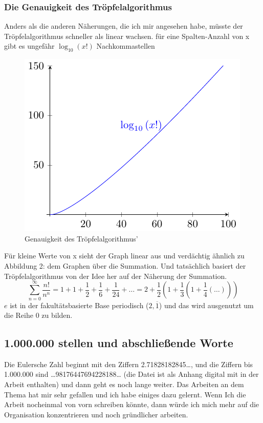\subsubsection{Die Genauigkeit des Tröpfelalgorithmus}
Anders als die anderen Näherungen, die ich mir angesehen habe, müsste der Tröpfelalgorithmus schneller als linear wachsen. für eine Spalten-Anzahl von x gibt es ungefähr $\log_{10}{(x!)}$ Nachkommastellen
\begin{figure}[h]
\includegraphics{medien2/log10/log.pdf}
\centering
\caption{Genauigkeit des Tröpfelalgorithmus'}
\end{figure}
\par Für kleine Werte von x sieht der Graph linear aus und verdächtig ähnlich zu Abbildung 2: dem Graphen über die Summation. Und tatsächlich basiert der Tröpfelalgorithmus von der Idee her auf der Näherung der Summation. \[
  \sum_{n=0}^\infty{ \frac{n!}{n^n} } = 1 + 1 + \frac{1}{2} + \frac{1}{6} +\frac{1}{24} + \dots = 2 + \frac{1}{2}(1+ \frac{1}{3}(1+\frac{1}{4}(\dots)))
\] $e$ ist in der fakultätsbasierte Base periodisch ($2,\overline1$) und das wird ausgenutzt um die Reihe 0 zu bilden.
\subsection{1.000.000 stellen und abschließende Worte}
\par Die Eulersche Zahl beginnt mit den Ziffern 2.71828182845\dots, und die Ziffern bis 1.000.000 sind \dots98176447694228188\dots{} (die Datei ist als Anhang digital mit in der Arbeit enthalten) und dann geht es noch lange weiter. Das Arbeiten an dem Thema hat mir sehr gefallen und ich habe einiges dazu gelernt. Wenn Ich die Arbeit nocheinmal von vorn schreiben könnte, dann würde ich mich mehr auf die Organisation konzentrieren und noch gründlicher arbeiten.
